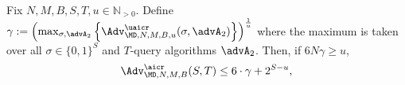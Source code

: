 \begin{lemma}%
\label{lem:nu2ai}
Fix $N,M,B,S,T,u\in \mathbb{N}_{>0}$. Define $
\gamma :=  \left(\max_{\sigma,\advA_2} \left\{\Adv^{\uaicr}_{\MD,N,M,B,u} (\sigma, \advA_2) \right\}\right)^{\frac{1}{u}}$ where the maximum is taken over all $\sigma\in \{0,1\}^S$ and $T$-query algorithms $\advA_2$. Then, if $6N\gamma\geq u$,
\begin{align*}
\Adv_{\MD,N,M,B}^{\aicr}(S,T)  \le 6\cdot   \gamma + 2^{S-u},
\end{align*}
\end{lemma}
\newcommand{\lemmaone}{
\begin{proof}

\ifnum\eprintversion=0
\constructiveChernoffPrlims
\fi 

Define 
\begin{align*}
\gamma :=  \left(\max_{\sigma,\advA_2} \left\{\Adv^{\uaicr}_{\MD,N,M,B,u} (\sigma, \advA_2) \right\}\right)^{\frac{1}{u}}.
\end{align*}

We need to upper bound $\Pr_{h,a}\left[{\AICR_{h,a}(\advA)}=\true\right]$ for every $(S,T)$-AI adversary $\advA$. %
We say that $h$ is \emph{easy} for adversary $\advA = (\advA_1,\advA_2)$ if $\advA$ wins the $\AICR_{h,a}$ game on a random $a\getsr[N]$ with probability $6\gamma$. That is, 
\begin{align*}
h \text{ is easy for } \advA \Longleftrightarrow \Pr_{a\getsr [N]}\left[\AICR_{h,a}(\advA) = \true\right]\geq 6\gamma .
\end{align*}


\end{proof}}
